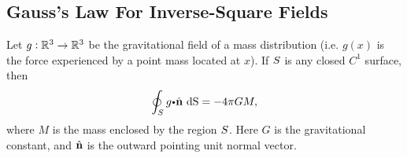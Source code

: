 %

\subsection{Gauss's Law For  Inverse-Square  Fields}

  \begin{proposition}
    Let $g:\mathbb{R}^3 \to \mathbb{R}^3$ be the gravitational field of a mass distribution (i.e. $g(x)$ is the force experienced by a point mass located at $x$).
    If $S$ is any closed $C^1$ surface, then
    \begin{equation*}
      \doint_\superficie g \bp \hat{ \vector{n}} \,   \d \S= - 4 \pi G M,
    \end{equation*}
    where $M$ is the mass enclosed by the region $S$.
    Here $G$ is the gravitational constant, and $\hat{ \mathbf{ n}}$ is the outward pointing unit normal vector.
  \end{proposition}

